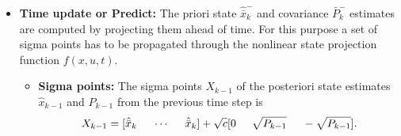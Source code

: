 \begin{itemize}
	\begin{comment}
    \item \textbf{Unscented transform}
    \begin{equation}
        \begin{split}
            X &= [ \bar x \hspace{5mm} \cdots \hspace{5mm} \bar x ]+ \sqrt c [ 0 \hspace{5mm} \sqrt \Sigma_x \hspace{5mm} - \sqrt \Sigma_x ]\\
            Y &= g(X) \\
            \bar y &= Y w_m\\
            \Sigma_y &= Y W Y^T \\
            \Sigma_{xy} &= X W Y^T,
        \end{split}
    \end{equation}
    where $X$ is the matrix of sigma points. $c=\alpha^2(n+\kappa)$, the vector $w_m$ and matrix $W$ are given by
    \begin{equation}
        \begin{split}
        w_m &= [W_m^0 \hspace{5mm} \cdots \hspace{5mm} W_m^{2n} ]\\
        W &= (I-[w_m \hspace{2mm} \cdots \hspace{2mm} w_m])diag(W_c^0 \hspace{2mm} \cdots \hspace{2mm} W_c^{2n}) (I-[w_m \hspace{2mm} \cdots \hspace{2mm} w_m])^T.
        \end{split}
    \end{equation} 
    \end{comment}
    \item \textbf{Time update or Predict:} 
	 The priori state $\hat{\bar x}^-_k$ and covariance ${\bar P}^-_k$ estimates are computed by projecting them ahead of time. For this purpose a set of sigma points has to be propagated through the nonlinear state projection function $f(x,u,t)$. 
    \begin{itemize}
        \item \textbf{Sigma points:} The sigma points $X_{k-1}$ of the posteriori state estimates $\hat x_{k-1}$ and $P_{k-1}$ from the previous time step is
        \begin{equation}
        X_{k-1} = [ \hat{\bar{x}}_k \hspace{5mm} \cdots \hspace{5mm} \hat{\bar{x}}_k]+ \sqrt c [ 0 \hspace{5mm} \sqrt{P_{k-1}} \hspace{5mm} - \sqrt{P_{k-1}} ].
        \end{equation}


\end{itemize}
\end{itemize}
